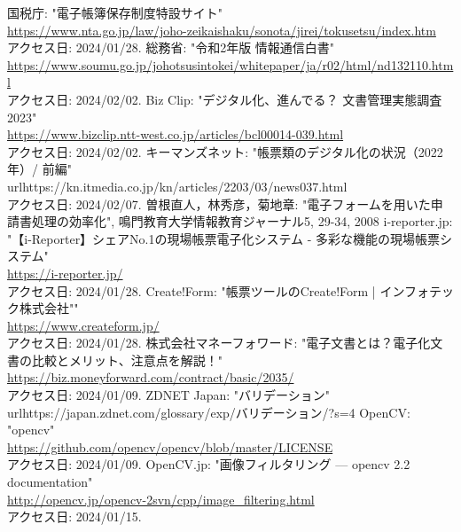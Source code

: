 \documentclass[uplatex, report, a4j, 10pt]{jsbook}
\begin{document}
\begin{thebibliography}{0}
  国税庁: "電子帳簿保存制度特設サイト"\\\url{https://www.nta.go.jp/law/joho-zeikaishaku/sonota/jirei/tokusetsu/index.htm}\\アクセス日: 2024/01/28.
  総務省: "令和2年版 情報通信白書"\\\url{https://www.soumu.go.jp/johotsusintokei/whitepaper/ja/r02/html/nd132110.html}\\アクセス日: 2024/02/02.
  Biz Clip: "デジタル化、進んでる？ 文書管理実態調査2023"\\\url{https://www.bizclip.ntt-west.co.jp/articles/bcl00014-039.html}\\アクセス日: 2024/02/02.
  キーマンズネット: "帳票類のデジタル化の状況（2022年）/ 前編"\\url{https://kn.itmedia.co.jp/kn/articles/2203/03/news037.html}\\アクセス日: 2024/02/07.
  曽根直人，林秀彦，菊地章: "電子フォームを用いた申請書処理の効率化", 鳴門教育大学情報教育ジャーナル5, 29-34, 2008
  i-reporter.jp: "【i-Reporter】シェアNo.1の現場帳票電子化システム - 多彩な機能の現場帳票システム"\\\url{https://i-reporter.jp/}\\アクセス日: 2024/01/28.
  Create!Form: "帳票ツールのCreate!Form | インフォテック株式会社""\\\url{https://www.createform.jp/}\\アクセス日: 2024/01/28.
  株式会社マネーフォワード: "電子文書とは？電子化文書の比較とメリット、注意点を解説！"\\\url{https://biz.moneyforward.com/contract/basic/2035/}\\アクセス日: 2024/01/09.
  ZDNET Japan: "バリデーション"\\url{https://japan.zdnet.com/glossary/exp/バリデーション/?s=4}
  OpenCV: "opencv"\\\url{https://github.com/opencv/opencv/blob/master/LICENSE}\\アクセス日: 2024/01/09.
  OpenCV.jp: "画像フィルタリング — opencv 2.2 documentation"\\\url{http://opencv.jp/opencv-2svn/cpp/image_filtering.html}\\アクセス日: 2024/01/15.

\end{thebibliography}
\end{document}
